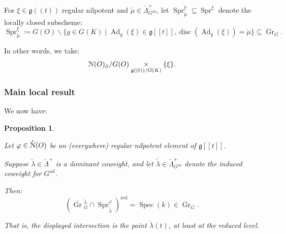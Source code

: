 \documentclass[reqno,11pt]{amsart}
\numberwithin{equation}{subsection}
\newtheorem{prop}[thm]{Proposition}
\theoremstyle{remark}
\newcommand{\sN}{{\EuScript N}}
\newcommand{\fg}{{\mathfrak g}}
\newcommand{\on}{\operatorname}
\newcommand{\ol}[1]{\overline{#1}{}}
\newcommand{\Spec}{\on{Spec}}
\newcommand{\ad}{\on{ad}}
\newcommand{\Ad}{\on{Ad}}
\newcommand{\vph}{\varphi}
\newcommand{\Gr}{\on{Gr}}
\newcommand{\Spr}{\on{Spr}}
\renewcommand{\o}[1]{\mathring{#1}}
\renewcommand{\subset}{\subseteq}
\begin{document}
\subsubsection{}

For $\xi \in \fg((t))$ regular nilpotent and
$\check{\mu} \in \check{\Lambda}_{G^{\ad}}^+$, let 
$\Spr_{\check{\mu}}^{\xi} \subset \Spr^{\xi}$ denote the locally
closed subscheme:
%
\[
\Spr_{\check{\mu}}^{\xi} \coloneqq
G(O)\backslash \{g \in G(K) \mid \Ad_g(\xi) \in \fg[[t]], 
\on{disc}(\Ad_g(\xi)) = \check{\mu}
\} \subset \Gr_G.
\]

\noindent In other words, we take:
%
\[
\sN(O)_{\check{\mu}}/G(O) \underset{\fg((t))/G(K)}{\times} \{\xi\}.
\]

\subsubsection{Main local result}

We now have:

\begin{prop}\label{p:spr}

Let $\vph \in \o{\sN}(O)$ be an (\emph{everywhere}) regular nilpotent element
of $\fg[[t]]$.

Suppose $\check{\lambda} \in \check{\Lambda}^+$ is a dominant
coweight, and let $\ol{\check{\lambda}} \in \check{\Lambda}_{G^{\ad}}^+$ denote
the induced coweight for $G^{\ad}$.

Then:
%
\[
(\ol{\Gr}_G^{\check{\lambda}} 
\cap \Spr_{\ol{\check{\lambda}}}^{\vph})^{\on{red}} = \Spec(k) \in \Gr_G.
\]

\noindent That is, the displayed intersection is the point $\check{\lambda}(t)$, 
at least at the reduced level. 

\end{prop}
\end{document}
